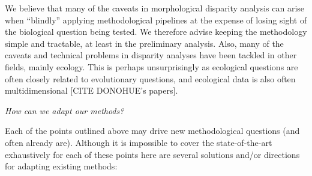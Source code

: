 \documentclass[12pt,letterpaper]{article}
\renewcommand{\subsection}[1]{%
\bigskip
\begin{center}
\begin{large}
\normalfont\itshape #1
\end{large}
\end{center}}
\begin{document}
We believe that many of the caveats in morphological disparity analysis can arise when ``blindly'' applying methodological pipelines at the expense of losing sight of the  biological question being tested.
We therefore advise keeping the methodology simple and tractable, at least in the preliminary analysis.
Also, many of the caveats and technical problems in disparity analyses have been tackled in other fields, mainly ecology.
This is perhaps unsurprisingly as ecological questions are often closely related to evolutionary questions, and ecological data is also often multidimensional [CITE DONOHUE's papers].

\subsection{How can we adapt our methods?}
Each of the points outlined above may drive new methodological questions (and often already are).
Although it is impossible to cover the state-of-the-art exhaustively for each of these points here are several solutions and/or directions for adapting existing methods:
\end{document}
